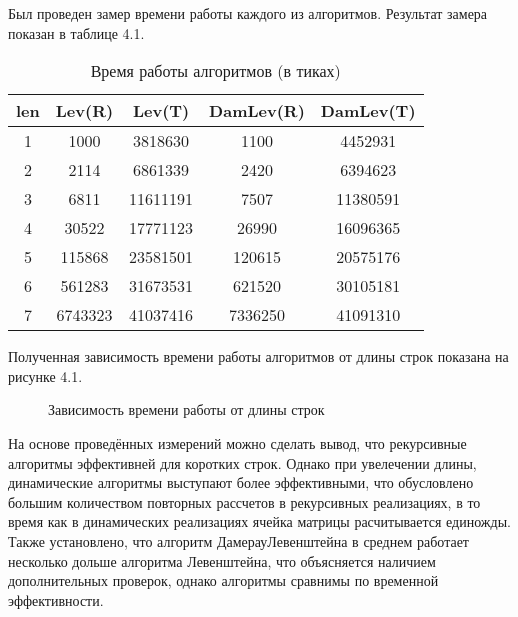 \documentclass[12pt]{report}
\begin{document}
Был проведен замер времени работы каждого из алгоритмов. Результат замера показан в таблице 4.1.


\begin{table} [ht]
	\caption{Время работы алгоритмов (в тиках)}
\begin{tabular}{|c c c c c|} 
 	\hline
	len & Lev(R) & Lev(T) & DamLev(R) & DamLev(T) \\ [0.8ex] 
 	\hline\hline
 	1 & 1000 & 3818630 & 1100 & 4452931\\
 	\hline
 	2 & 2114 & 6861339 & 2420 & 6394623\\
 	\hline
	3 & 6811 & 11611191 & 7507 & 11380591\\
	\hline
	4 & 30522 & 17771123 & 26990 & 16096365\\
	\hline
	5 & 115868 & 23581501 & 120615 & 20575176\\
	\hline
	6 & 561283 & 31673531 & 621520 & 30105181\\
	\hline
	7 & 6743323 & 41037416 & 7336250 & 41091310\\
	\hline
	\end{tabular}
\end{table}

Полученная зависимость времени работы алгоритмов от длины строк показана на рисунке 4.1.


\begin{figure} [H]
\caption{Зависимость времени работы от длины строк}
\end{figure}


\par
На основе проведённых измерений можно сделать вывод, что рекурсивные алгоритмы эффективней для коротких строк. Однако при увелечении длины, динамические алгоритмы выступают более эффективными, что обусловлено большим количеством повторных рассчетов в рекурсивных реализациях, в то время как в динамических реализациях ячейка матрицы расчитывается единожды. Также установлено, что алгоритм ДамерауЛевенштейна в среднем работает несколько дольше алгоритма Левенштейна, что объясняется наличием дополнительных проверок, однако алгоритмы сравнимы по временной эффективности.
\end{document}
